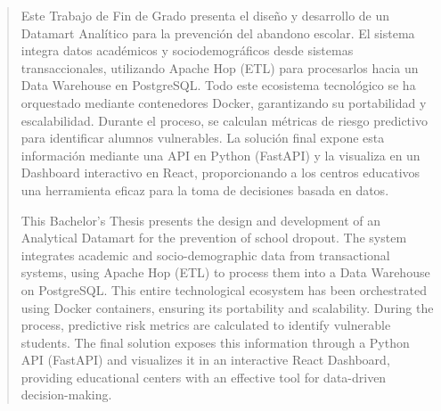 
\pagestyle{empty}
\begin{abstract}
  Este Trabajo de Fin de Grado presenta el diseño y desarrollo de un Datamart Analítico para la prevención del abandono escolar. El sistema integra datos académicos y sociodemográficos desde sistemas transaccionales, utilizando Apache Hop (ETL) para procesarlos hacia un Data Warehouse en PostgreSQL. Todo este ecosistema tecnológico se ha orquestado mediante contenedores Docker, garantizando su portabilidad y escalabilidad. Durante el proceso, se calculan métricas de riesgo predictivo para identificar alumnos vulnerables. La solución final expone esta información mediante una API en Python (FastAPI) y la visualiza en un Dashboard interactivo en React, proporcionando a los centros educativos una herramienta eficaz para la toma de decisiones basada en datos.

  \vspace*{25pt}
  \begin{segundoresumo}
    This Bachelor's Thesis presents the design and development of an Analytical Datamart for the prevention of school dropout. The system integrates academic and socio-demographic data from transactional systems, using Apache Hop (ETL) to process them into a Data Warehouse on PostgreSQL. This entire technological ecosystem has been orchestrated using Docker containers, ensuring its portability and scalability. During the process, predictive risk metrics are calculated to identify vulnerable students. The final solution exposes this information through a Python API (FastAPI) and visualizes it in an interactive React Dashboard, providing educational centers with an effective tool for data-driven decision-making.
  \end{segundoresumo}
\vspace*{25pt}

\end{abstract}
\pagestyle{fancy}

